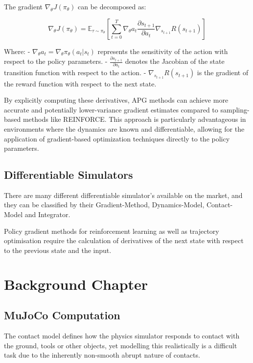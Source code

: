 \documentclass[logo,bsc,singlespacing,parskip]{infthesis}
\begin{document}
The gradient $\nabla_\theta J(\pi_\theta)$ can be decomposed as:

\[
\nabla_\theta J(\pi_\theta) = \mathbb{E}_{\tau \sim \pi_\theta} \left[ \sum_{t=0}^{T} \nabla_\theta a_t \frac{\partial s_{t+1}}{\partial a_t} \nabla_{s_{t+1}} R(s_{t+1}) \right]
\]

Where:
- $\nabla_\theta a_t = \nabla_\theta \pi_\theta(a_t | s_t)$ represents the sensitivity of the action with respect to the policy parameters.
- $\frac{\partial s_{t+1}}{\partial a_t}$ denotes the Jacobian of the state transition function with respect to the action.
- $\nabla_{s_{t+1}} R(s_{t+1})$ is the gradient of the reward function with respect to the next state.

By explicitly computing these derivatives, APG methods can achieve more accurate and potentially lower-variance gradient estimates compared to sampling-based methods like REINFORCE. This approach is particularly advantageous in environments where the dynamics are known and differentiable, allowing for the application of gradient-based optimization techniques directly to the policy parameters.




\section{Differentiable Simulators}

There are many different differentiable simulator's available on the market, and they can be classified by their Gradient-Method, Dynamics-Model, Contact-Model and Integrator. \citet{Newbury2024ASimulators}

Policy gradient methods for reinforcement learning as well as trajectory optimisation require the calculation of derivatives of the next state with respect to the previous state and the input. 


\chapter{Background Chapter}


\section {MuJoCo Computation}

The contact model defines how the physics simulator responds to contact with the ground, tools or other objects, yet modelling this realistically is a difficult task due to the inherently non-smooth abrupt nature of contacts. 
\end{document}
